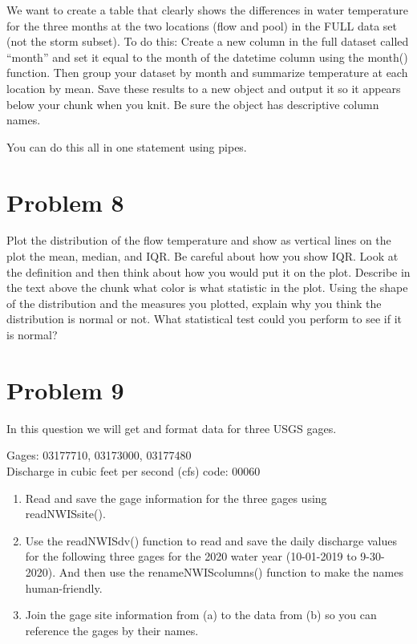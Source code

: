 \documentclass[
]{book}
\begin{document}
We want to create a table that clearly shows the differences in water temperature for the three months at the two locations (flow and pool) in the FULL data set (not the storm subset). To do this: Create a new column in the full dataset called ``month'' and set it equal to the month of the datetime column using the month() function. Then group your dataset by month and summarize temperature at each location by mean. Save these results to a new object and output it so it appears below your chunk when you knit. Be sure the object has descriptive column names.

You can do this all in one statement using pipes.

\hypertarget{problem-8}{%
\section{Problem 8}\label{problem-8}}

Plot the distribution of the flow temperature and show as vertical lines on the plot the mean, median, and IQR. Be careful about how you show IQR. Look at the definition and then think about how you would put it on the plot. Describe in the text above the chunk what color is what statistic in the plot. Using the shape of the distribution and the measures you plotted, explain why you think the distribution is normal or not. What statistical test could you perform to see if it is normal?

\hypertarget{problem-9}{%
\section{Problem 9}\label{problem-9}}

In this question we will get and format data for three USGS gages.

Gages: 03177710, 03173000, 03177480\\
Discharge in cubic feet per second (cfs) code: 00060

\begin{enumerate}
\def\labelenumi{\alph{enumi}.}
\item
  Read and save the gage information for the three gages using readNWISsite().
\item
  Use the readNWISdv() function to read and save the daily discharge values for the following three gages for the 2020 water year (10-01-2019 to 9-30-2020). And then use the renameNWIScolumns() function to make the names human-friendly.
\item
  Join the gage site information from (a) to the data from (b) so you can reference the gages by their names.
\end{enumerate}
\end{document}
